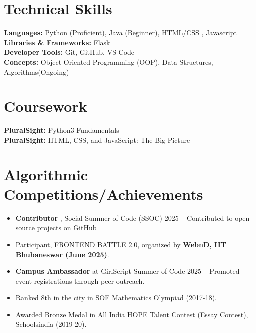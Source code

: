 \documentclass[letterpaper,11pt]{article}
\newcommand{\resumeItem}[1]{
  \item\small{
    {#1 \vspace{-2pt}}
  }
}
\newcommand{\resumeItemListStart}{\begin{itemize}}
\newcommand{\resumeItemListEnd}{\end{itemize}\vspace{-5pt}}
\begin{document}
\section{Technical Skills}
\begin{itemize}[leftmargin=0.15in, label={}]
    {\item{
       
        \textbf{Languages:} Python (Proficient), Java (Beginner), HTML/CSS , Javascript\\
        \textbf{Libraries \& Frameworks:} Flask\\
        \textbf{Developer Tools:} Git, GitHub, VS Code\\
        \textbf{Concepts:} Object-Oriented Programming (OOP), Data Structures, Algorithms(Ongoing)\\
        
    }}
\end{itemize}

\section{ Coursework}
\begin{itemize}[leftmargin=0.15in, label={}]
\small{\item{
       
        \textbf{PluralSight:} Python3 Fundamentals \\
        \textbf{PluralSight:} HTML, CSS, and JavaScript: The Big Picture\\ }}

\end{itemize}

\section{Algorithmic Competitions/Achievements}
\resumeItemListStart
  \resumeItem{\textbf{Contributor} , Social Summer of Code (SSOC) 2025 – Contributed to open-source projects on GitHub }
  \resumeItem{Participant, FRONTEND BATTLE 2.0, organized by \textbf{WebnD, IIT Bhubaneswar (June 2025)}.}
  \resumeItem{\textbf{Campus Ambassador} at GirlScript Summer of Code 2025 – Promoted event registrations through peer outreach.}
  \resumeItem{Ranked 8th in the city in SOF Mathematics Olympiad (2017-18).}
  \resumeItem{Awarded Bronze Medal in All India HOPE Talent Contest (Essay Contest), Schoolsindia (2019-20).}
\resumeItemListEnd



\end{document}
